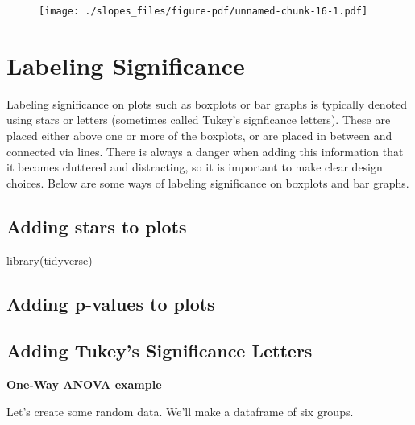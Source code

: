 \documentclass[
  letterpaper,
  DIV=11,
  numbers=noendperiod]{scrreprt}
\newenvironment{Shaded}{\begin{snugshade}}{\end{snugshade}}
\newcommand{\FunctionTok}[1]{\textcolor[rgb]{0.28,0.35,0.67}{#1}}
\newcommand{\NormalTok}[1]{\textcolor[rgb]{0.00,0.23,0.31}{#1}}
\begin{document}
\begin{figure}[H]

{\centering \texttt{[image: ./slopes\_files/figure-pdf/unnamed-chunk-16-1.pdf]}

}

\end{figure}


\hypertarget{labeling-significance}{%
\chapter{Labeling Significance}\label{labeling-significance}}

Labeling significance on plots such as boxplots or bar graphs is
typically denoted using stars or letters (sometimes called Tukey's
signficance letters). These are placed either above one or more of the
boxplots, or are placed in between and connected via lines. There is
always a danger when adding this information that it becomes cluttered
and distracting, so it is important to make clear design choices. Below
are some ways of labeling significance on boxplots and bar graphs.

\hypertarget{adding-stars-to-plots}{%
\section{Adding stars to plots}\label{adding-stars-to-plots}}

\begin{Shaded}
\begin{Highlighting}[]
\FunctionTok{library}\NormalTok{(tidyverse)}
\end{Highlighting}
\end{Shaded}

\hypertarget{adding-p-values-to-plots}{%
\section{Adding p-values to plots}\label{adding-p-values-to-plots}}

\hypertarget{adding-tukeys-significance-letters}{%
\section{Adding Tukey's Significance
Letters}\label{adding-tukeys-significance-letters}}

\textbf{One-Way ANOVA example}

Let's create some random data. We'll make a dataframe of six groups.
\end{document}
